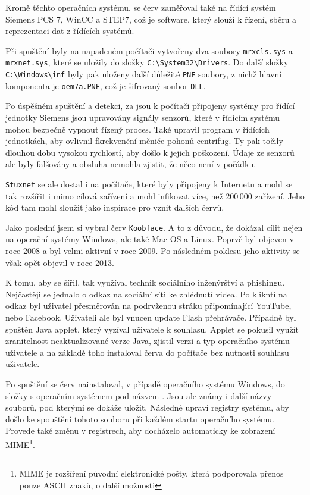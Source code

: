 \documentclass[a4paper,12pt]{article}
\begin{document}
Kromě těchto operačních systému, se červ zaměřoval také na řídící systém Siemens PCS 7, WinCC a STEP7, což je software, který slouží k řízení, sběru a reprezentaci dat z řídících systémů\cite{stuxnet-nordvpn}.

Při spuštění byly na napadeném počítači vytvořeny dva soubory \texttt{mrxcls.sys} a \texttt{mrxnet.sys}, které se uložily do složky \texttt{C:\textbackslash System32\textbackslash Drivers}. Do další složky \texttt{C:\textbackslash Win\-dows\textbackslash inf} byly pak uloženy další důležité \texttt{PNF} soubory, z nichž hlavní komponenta je \texttt{oem7a.PNF}, což je šifrovaný soubor \texttt{DLL}.\cite{stuxnet-fsecure}

Po úspěšném spuštění a detekci, za jsou k počítači připojeny systémy pro řídící jednotky Siemens jsou upravovány signály senzorů, které v řídícím systému mohou bezpečně vypnout řízený proces. Také upravil program v řídících jednotkách, aby ovlivnil fkrekvenční měniče pohonů centrifug. Ty pak točily dlouhou dobu vysokou rychlostí, aby došlo k jejich poškození. Údaje ze senzorů ale byly falšovány a obsluha nemohla zjistit, že něco není v pořádku.\cite{stuxnet-nordvpn}\cite{stuxnet-avast}

\texttt{Stuxnet} se ale dostal i na počítače, které byly připojeny k Internetu a mohl se tak rozšířit i mimo cílová zařízení a mohl infikovat více, než 200\,000 zařízení\cite{stuxnet-zdnet}. Jeho kód tam mohl sloužit jako inspirace pro vznit dalších červů\cite{stuxnet-avast}.

Jako poslední jsem si vybral červ \texttt{Koobface}. A to z důvodu, že dokázal cílit nejen na operační systémy Windows, ale také Mac OS a Linux. Poprvě byl objeven v roce 2008 a byl velmi aktivní v roce 2009. Po následném poklesu jeho aktivity se však opět objevil v roce 2013.\cite{koobface-kaspersky}

K tomu, aby se šířil, tak využíval technik sociálního inženýrštví a phishingu. Nejčastěji se jednalo o odkaz na sociální síti ke zhlédnutí videa. Po klikntí na odkaz byl uživatel přesměrován na podrvženou stráku připomínající YouTube, nebo Facebook. Uživateli ale byl vnucen update Flash přehrávače\cite{koobface-naked}. Případně byl spuštěn Java applet, který vyzíval uživatele k souhlasu. Applet se pokusil využít zranitelnost neaktualizované verze Java, zjistil verzi a typ operačního systému uživatele a na základě toho instaloval červa do počítače bez nutnosti souhlasu uživatele\cite{koobface-softpedia}.

Po spuštění se červ nainstaloval, v případě operačního systému Windows, do složky s operačním systémem pod názvem \cite{koobface-fsecure}. Jsou ale známy i další názvy souborů, pod kterými se dokáže uložit\cite{koobface-kaspersky}. Následně upraví registry systému, aby došlo ke spouštění tohoto souboru při každém startu operačního systému. Provede také změnu v registrech, aby docházelo automaticky ke zobrazení MIME\footnote{MIME je rozšíření původní elektronické pošty, která podporovala přenos pouze ASCII znaků, o další možnosti}\cite{koobface-fsecure}.
\end{document}
